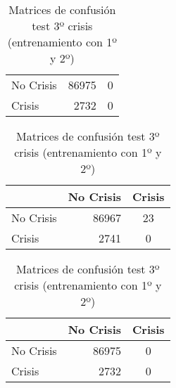 \begin{table}
\begin{center}
\begin{subtable}[c]{0.4\textwidth}
\begin{tabular}{lrc}
                \hline
                No Crisis & 86975 & 0 \\
                Crisis & 2732 & 0\\
                \hline
            \end{tabular}
            \label{tab:mat-conf-stats-1.13}
        \end{subtable}
        \begin{subtable}[c]{0.4\textwidth}
            \begin{tabular}{lrc}
                \hline
                 & No Crisis & Crisis \\
                \hline
                No Crisis & 86967 & 23 \\
                Crisis & 2741 & 0\\
                \hline
            \end{tabular}
            \label{tab:mat-conf-raw-1.13}
        \end{subtable}
        \hspace{1em}\vspace{1em}
        \begin{subtable}[c]{0.4\textwidth}
                \begin{tabular}{lrc}
                \hline
                 & No Crisis & Crisis \\
                \hline
                No Crisis & 86975 & 0 \\
                Crisis & 2732 & 0\\
                \hline
            \end{tabular}
            \label{tab:mat-conf-stats-1.14}
        \end{subtable}
        \caption{Matrices de confusión test 3º crisis (entrenamiento con 1º y 2º)}
        \label{tab:matriz-test-2-3a}
    \end{center}
\end{table}
